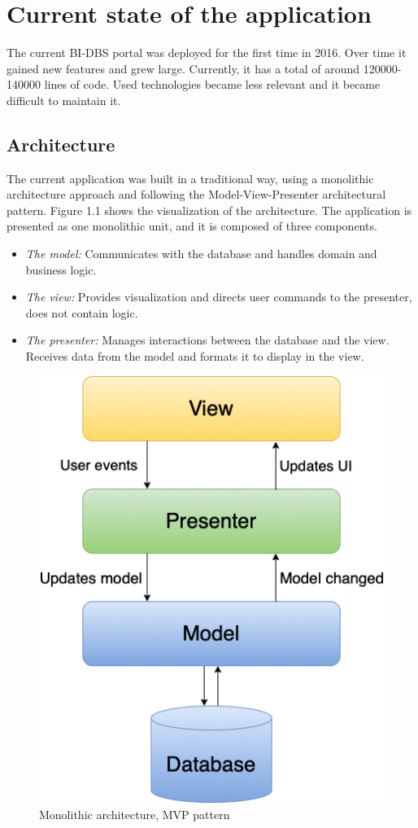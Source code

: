 \section{Current state of the application}
The current BI-DBS portal was deployed for the first time in 2016\cite{bt-malec}. Over time it gained new features and grew large. Currently, it has a total of around 120000-140000 lines of code\cite{mt-plyskach}. Used technologies became less relevant and it became difficult to maintain it.

\subsection{Architecture}
The current application was built in a traditional way, using a monolithic architecture approach and following the Model-View-Presenter architectural pattern\cite{mvp-potel}\cite{architecture-haris}. Figure 1.1 shows the visualization of the architecture. The application is presented as one monolithic unit, and it is composed  of three components. 

\begin{itemize}
  \item \emph{The model:} Communicates with the database and handles domain and business logic.
  \item \emph{The view:} Provides visualization and directs user commands to the presenter, does not contain logic.
  \item \emph{The presenter:} Manages interactions between the database and the view. Receives data from the model and formats it to display in the view.
\end{itemize}

\begin{figure}[hp]
\centering
\includegraphics[scale=0.52]{../png/mvp_monolithic.png}
\caption{Monolithic architecture, MVP pattern}
\end{figure}

